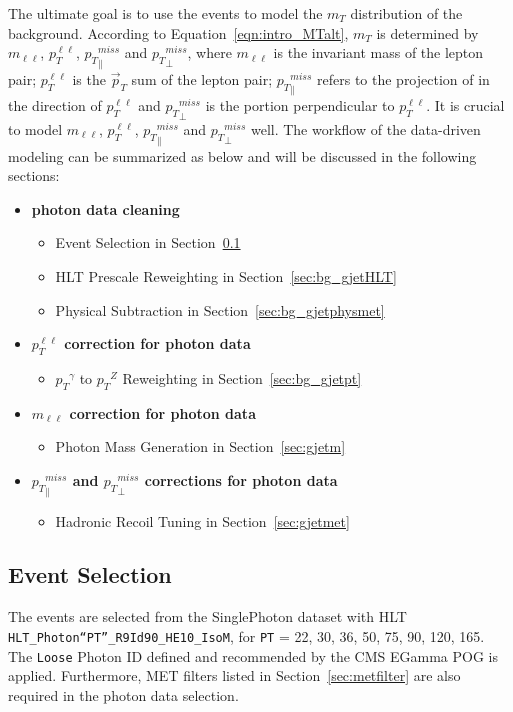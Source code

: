\vspace{0.3cm}
The ultimate goal is to use the \gjets events to model the $m_T$ distribution of the \Zjets background. According to Equation~\ref{eqn:intro_MTalt}, $m_T$ is determined by $m_{\ell\ell}$, ${p}_{T}^{\ell\ell}$, ${p_{T}}^{miss}_\parallel$ and ${p_{T}}^{miss}_\perp$, where $m_{\ell\ell}$ is the invariant mass of the lepton pair; ${p}_{T}^{\ell\ell}$ is the $\vec p_T$ sum of the lepton pair; ${p_{T}}^{miss}_\parallel$ refers to the projection of \ptmiss in the direction of ${p}_{T}^{\ell\ell}$ and ${p_{T}}^{miss}_\perp$ is the portion perpendicular to ${p}_{T}^{\ell\ell}$. It is crucial to model $m_{\ell\ell}$, ${p}_{T}^{\ell\ell}$, ${p_{T}}^{miss}_\parallel$ and ${p_{T}}^{miss}_\perp$ well. The workflow of the \Zjets data-driven modeling can be summarized as below and will be discussed in the following sections:
\begin{itemize}
\item \textbf{photon data cleaning}
\begin{itemize}
\item \gjets Event Selection in Section~\ref{sec:bg_gjetsel}
\item \gjets HLT Prescale Reweighting in Section~\ref{sec:bg_gjetHLT}
\item Physical \ptmiss Subtraction in Section~\ref{sec:bg_gjetphysmet}
\end{itemize}
\item \textbf{${p}_{T}^{\ell\ell}$ correction for photon data}
\begin{itemize}
\item ${p_T}^{\gamma}$ to ${p_T}^Z$ Reweighting in Section~\ref{sec:bg_gjetpt}
\end{itemize}
\item \textbf{$m_{\ell\ell}$ correction for photon data}
\begin{itemize}
\item Photon Mass Generation in Section~\ref{sec:gjetm}
\end{itemize}
\item \textbf{${p_{T}}^{miss}_\parallel$ and ${p_{T}}^{miss}_\perp$ corrections for photon data}
\begin{itemize}
\item \ptmiss Hadronic Recoil Tuning in Section~\ref{sec:gjetmet}
\end{itemize}
\end{itemize}

\subsection{\boldmath{\gjets} Event Selection}\label{sec:bg_gjetsel}
The \gjets events are selected from the SinglePhoton dataset with HLT \texttt{HLT\_Photon``PT''\_R9Id90\_HE10\_IsoM}, for \texttt{PT} = 22, 30, 36, 50, 75, 90, 120, 165\GeV. The \texttt{Loose} Photon ID defined and recommended by the CMS EGamma POG is applied. Furthermore, MET filters listed in Section~\ref{sec:metfilter} are also required in the photon data selection.

